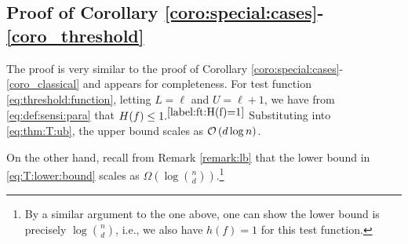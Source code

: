 \documentclass[onecolumn,letterpaper]{IEEEtran}
\newcommand{\cO}{{\cal O}}
\newcommand{\up}{{U}}
\newcommand{\lw}{{L}}
\newcommand{\na}{{a}}
\newcommand{\plsize}{{\chi}}
\newcommand{\mean}{{\mu}}
\newcommand{\var}{{\sigma^{2}}}
\newcommand{\fh}{{h(f)}}
\newcommand{\fH}{{H(f)}}
\begin{document}
\subsection{Proof of Corollary \ref{coro:special:cases}-\ref{coro_threshold}}
\label{app:coro_threshold}
\begin{IEEEproof}
The proof is very similar to the proof of Corollary \ref{coro:special:cases}-\ref{coro_classical} and appears for completeness.
For test function \eqref{eq:threshold:function}, letting $\lw=\ell$ and $\up=\ell+1$, we have from \eqref{eq:def:sensi:para} that $\fH\leq 1. ^{\ref{label:ft:H(f)=1}}$ Substituting into \eqref{eq:thm:T:ub}, the upper bound scales as $\cO \left(d\log n\right)$. 




On the other hand,  recall from Remark \ref{remark:lb} that the lower bound in \eqref{eq:T:lower:bound} scales as $\Omega\left(\log \binom{n}{d}\right)$.\footnote{By a similar argument to the one above, one can show the lower bound is precisely $\log \binom{n}{d}$, i.e., we also have $\fh=1$ for this test function.} 

\end{IEEEproof}
\end{document}
